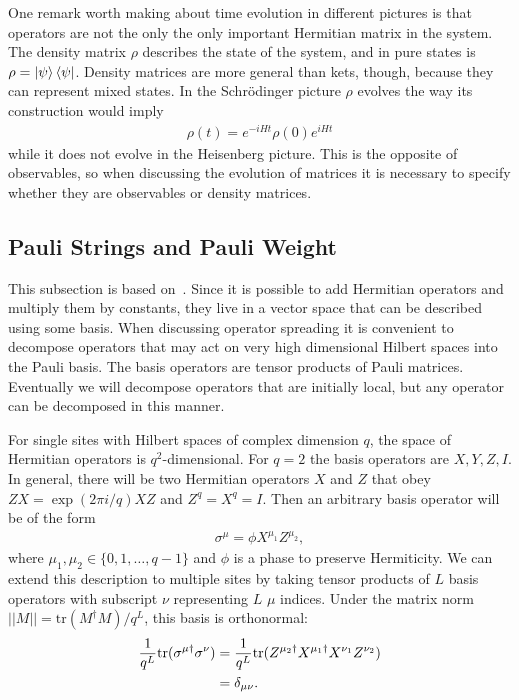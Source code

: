 One remark worth making about time evolution in different pictures is that operators are not the only the only important Hermitian matrix in the system. The density matrix $\rho$ describes the state of the system, and in pure states is $\rho = \left|\psi\right\rangle\left\langle\psi\right|$. Density matrices are more general than kets, though, because they can represent mixed states. In the Schr\"odinger picture $\rho$ evolves the way its construction would imply
\begin{align}
\rho(t) = e^{-iHt}\rho(0)e^{iHt}
\end{align}
while it does not evolve in the Heisenberg picture. This is the opposite of observables, so when discussing the evolution of matrices it is necessary to specify whether they are observables or density matrices.

\subsection{Pauli Strings and Pauli Weight} \label{sub:pauli}

This subsection is based on~\cite{Keyserlingk}. Since it is possible to add Hermitian operators and multiply them by constants, they live in a vector space that can be described using some basis. When discussing operator spreading it is convenient to decompose operators that may act on very high dimensional Hilbert spaces into the Pauli basis. The basis operators are tensor products of Pauli matrices. Eventually we will decompose operators that are initially local, but any operator can be decomposed in this manner.

For single sites with Hilbert spaces of complex dimension $q$, the space of Hermitian operators is $q^2$-dimensional. For $q=2$ the basis operators are $X, Y, Z, I$. In general, there will be two Hermitian operators $X$ and $Z$ that obey $ZX = \exp(2\pi i/q)XZ$ and $Z^q=X^q=I$. Then an arbitrary basis operator will be of the form 
\begin{align}
\sigma^\mu = \phi X^{\mu_1}Z^{\mu_2},
\end{align}
where $\mu_1, \mu_2\in\{0,1,\dots,q-1\}$ and $\phi$ is a phase to preserve Hermiticity. We can extend this description to multiple sites by taking tensor products of $L$ basis operators with subscript $\nu$ representing $L$ $\mu$ indices. Under the matrix norm $||M|| = \text{tr}(M^\dag M)/q^L$, this basis is orthonormal:
\begin{align}
\frac{1}{q^L}\text{tr}(\sigma^{\mu\dag}\sigma^\nu) &= \frac{1}{q^L}\text{tr}(Z^{\mu_2\dag}
	X^{\mu_1\dag}X^{\nu_1}Z^{\nu_2})\nonumber\\
&= \delta_{\mu\nu}.\label{eqn:orthonorm}
\end{align}

